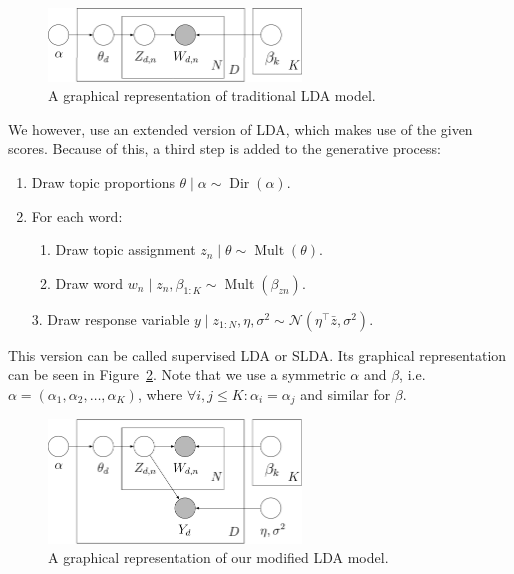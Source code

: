 \documentclass{article} %
\DeclareMathOperator{\Dir}{Dir}
\DeclareMathOperator{\Mult}{Mult}
\begin{document}
\begin{figure}[ht!]
  \centering
  \includegraphics[width=0.6\textwidth]{LDA.png}
  \caption{A graphical representation of traditional LDA model.}
  \label{fig:LDA}
\end{figure}

We however, use an extended version of LDA, which makes use of the given scores. 
Because of this, a third step is added to the generative process:

\begin{enumerate}
  \item Draw topic proportions $\theta \mid \alpha \sim \Dir(\alpha)$.
  \item For each word:
  \begin{enumerate}
    \item Draw topic assignment $z_n \mid \theta \sim \Mult(\theta)$.
    \item Draw word $w_n \mid z_n, \beta_{1:K} \sim \Mult(\beta_{zn})$.
  \end{enumerate}
  \item[3.] Draw response variable $y \mid z_{1:N}, \eta, \sigma^2 \sim \mathcal{N}(\eta^\top \bar{z}, \sigma^2)$.
\end{enumerate}

This version can be called supervised LDA or SLDA.
Its graphical representation can be seen in Figure~\ref{fig:SLDA}.
Note that we use a symmetric $\alpha$ and $\beta$, i.e. $\alpha=(\alpha_1, \alpha_2, \dots, \alpha_K)$, where $\forall i,j \leq K: \alpha_i = \alpha_j$ and similar for $\beta$.

\begin{figure}[ht!]
  \centering
  \includegraphics[width=0.6\textwidth]{SLDA.png}
  \caption{A graphical representation of our modified LDA model.}
  \label{fig:SLDA}
\end{figure}
\end{document}
